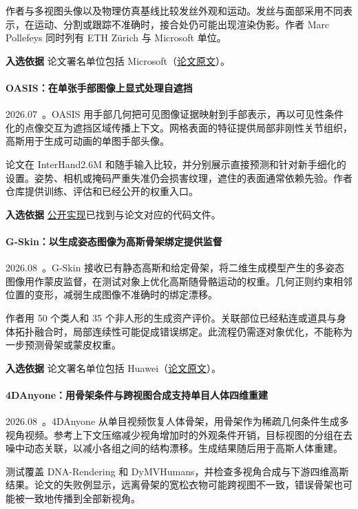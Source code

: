 作者与多视图头像以及物理仿真基线比较发丝外观和运动。发丝与面部采用不同表示，在运动、分割或跟踪不准确时，接合处仍可能出现渲染伪影。作者 Marc Pollefeys 同时列有 ETH Zürich 与 Microsoft 单位。

\textbf{入选依据} 论文署名单位包括 Microsoft（\href{https://arxiv.org/html/2607.23861v1}{论文原文}）。

\paragraph{OASIS：在单张手部图像上显式处理自遮挡}
2026.07~\cite{2607_29633}。OASIS 用手部几何把可见图像证据映射到手部表示，再以可见性条件化的点像交互为遮挡区域传播上下文。网格表面的特征提供局部非刚性关节组织，高斯用于生成可动画的单图手部头像。

论文在 InterHand2.6M 和随手输入比较，并分别展示直接预测和针对新手细化的设置。姿势、相机或掩码严重失准仍会损害纹理，遮住的表面通常依赖先验。作者仓库提供训练、评估和已经公开的权重入口。

\textbf{入选依据} \href{https://github.com/ivyyy77/oasis}{公开实现}已找到与论文对应的代码文件。

\paragraph{G-Skin：以生成姿态图像为高斯骨架绑定提供监督}
2026.08~\cite{2608_01726}。G-Skin 接收已有静态高斯和给定骨架，将二维生成模型产生的多姿态图像用作蒙皮监督，在测试对象上优化高斯随骨骼运动的权重。几何正则约束相邻位置的变形，减弱生成图像不准确时的绑定漂移。

作者用 50 个类人和 35 个非人形的生成资产评价。关联部位已经粘连或道具与身体拓扑融合时，局部连续性可能促成错误绑定。此流程仍需逐对象优化，不能称为一步预测骨架或蒙皮权重。

\textbf{入选依据} 论文署名单位包括 Huawei（\href{https://arxiv.org/abs/2608.01726}{论文原文}）。

\paragraph{4DAnyone：用骨架条件与跨视图合成支持单目人体四维重建}
2026.08~\cite{2608_20335}。4DAnyone 从单目视频恢复人体骨架，用骨架作为稀疏几何条件生成多视角视频。参考上下文压缩减少视角增加时的外观条件开销，目标视图的分组在去噪中动态关联，以减小各组之间的结构漂移。生成结果随后用于高斯人体重建。

测试覆盖 DNA-Rendering 和 DyMVHumans，并检查多视角合成与下游四维高斯结果。论文的失败例显示，远离骨架的宽松衣物可能跨视图不一致，错误骨架也可能被一致地传播到全部新视角。

